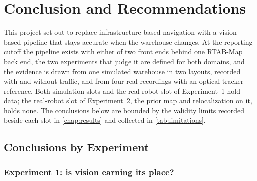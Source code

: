 \chapter[CONCLUSION AND RECOMMENDATIONS]{Conclusion and Recommendations}
\label{chap:conclusion}

This project set out to replace infrastructure-based navigation with a
vision-based pipeline that stays accurate when the warehouse changes. At the
reporting cutoff the pipeline exists with either of two front ends behind one
RTAB-Map back end, the two experiments that judge it are defined for both
domains, and the evidence is drawn from one simulated warehouse in two layouts,
recorded with and without traffic, and from four real recordings with an
optical-tracker reference. Both simulation slots and the real-robot slot of
Experiment~1 hold data; the real-robot slot of Experiment~2, the prior map and
relocalization on it, holds none. The conclusions below are bounded
by the validity limits recorded beside each slot in \cref{chap:results} and
collected in \cref{tab:limitations}.

\section{Conclusions by Experiment}
\label{sec:conclusions}

\subsection{Experiment 1: is vision earning its place?}

